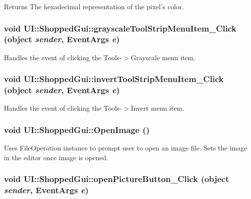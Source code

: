 \begin{DoxyReturn}{Returns}
The hexadecimal representation of the pixel's color. 
\end{DoxyReturn}
\hypertarget{class_u_i_1_1_shopped_gui_a9bfb029eb21eb1c7c4fddcee35d1d9fc}{
\subsubsection[{grayscaleToolStripMenuItem\_\-Click}]{\setlength{\rightskip}{0pt plus 5cm}void UI::ShoppedGui::grayscaleToolStripMenuItem\_\-Click (object {\em sender}, \/  EventArgs {\em e})}}
\label{class_u_i_1_1_shopped_gui_a9bfb029eb21eb1c7c4fddcee35d1d9fc}
Handles the event of clicking the Tools-\/$>$Grayscale menu item. \hypertarget{class_u_i_1_1_shopped_gui_a4b427f671412d87998b2ee692188e038}{
\subsubsection[{invertToolStripMenuItem\_\-Click}]{\setlength{\rightskip}{0pt plus 5cm}void UI::ShoppedGui::invertToolStripMenuItem\_\-Click (object {\em sender}, \/  EventArgs {\em e})}}
\label{class_u_i_1_1_shopped_gui_a4b427f671412d87998b2ee692188e038}
Handles the event of clicking the Tools-\/$>$Invert menu item. \hypertarget{class_u_i_1_1_shopped_gui_a3a27f074b7b204b1df148921a0dcc20c}{
\subsubsection[{OpenImage}]{\setlength{\rightskip}{0pt plus 5cm}void UI::ShoppedGui::OpenImage ()}}
\label{class_u_i_1_1_shopped_gui_a3a27f074b7b204b1df148921a0dcc20c}
Uses FileOperation instance to prompt user to open an image file. Sets the image in the editor once image is opened. \hypertarget{class_u_i_1_1_shopped_gui_a5a4be38d87e3d968e9336400e572b646}{
\subsubsection[{openPictureButton\_\-Click}]{\setlength{\rightskip}{0pt plus 5cm}void UI::ShoppedGui::openPictureButton\_\-Click (object {\em sender}, \/  EventArgs {\em e})}}
